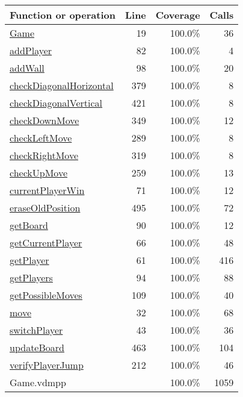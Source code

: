 \begin{longtable}{|l|r|r|r|}
\hline
Function or operation & Line & Coverage & Calls \\
\hline
\hline
\hyperref[Game:19]{Game} & 19&100.0\% & 36 \\
\hline
\hyperref[addPlayer:82]{addPlayer} & 82&100.0\% & 4 \\
\hline
\hyperref[addWall:98]{addWall} & 98&100.0\% & 20 \\
\hline
\hyperref[checkDiagonalHorizontal:379]{checkDiagonalHorizontal} & 379&100.0\% & 8 \\
\hline
\hyperref[checkDiagonalVertical:421]{checkDiagonalVertical} & 421&100.0\% & 8 \\
\hline
\hyperref[checkDownMove:349]{checkDownMove} & 349&100.0\% & 12 \\
\hline
\hyperref[checkLeftMove:289]{checkLeftMove} & 289&100.0\% & 8 \\
\hline
\hyperref[checkRightMove:319]{checkRightMove} & 319&100.0\% & 8 \\
\hline
\hyperref[checkUpMove:259]{checkUpMove} & 259&100.0\% & 13 \\
\hline
\hyperref[currentPlayerWin:71]{currentPlayerWin} & 71&100.0\% & 12 \\
\hline
\hyperref[eraseOldPosition:495]{eraseOldPosition} & 495&100.0\% & 72 \\
\hline
\hyperref[getBoard:90]{getBoard} & 90&100.0\% & 12 \\
\hline
\hyperref[getCurrentPlayer:66]{getCurrentPlayer} & 66&100.0\% & 48 \\
\hline
\hyperref[getPlayer:61]{getPlayer} & 61&100.0\% & 416 \\
\hline
\hyperref[getPlayers:94]{getPlayers} & 94&100.0\% & 88 \\
\hline
\hyperref[getPossibleMoves:109]{getPossibleMoves} & 109&100.0\% & 40 \\
\hline
\hyperref[move:32]{move} & 32&100.0\% & 68 \\
\hline
\hyperref[switchPlayer:43]{switchPlayer} & 43&100.0\% & 36 \\
\hline
\hyperref[updateBoard:463]{updateBoard} & 463&100.0\% & 104 \\
\hline
\hyperref[verifyPlayerJump:212]{verifyPlayerJump} & 212&100.0\% & 46 \\
\hline
\hline
Game.vdmpp & & 100.0\% & 1059 \\
\hline
\end{longtable}

